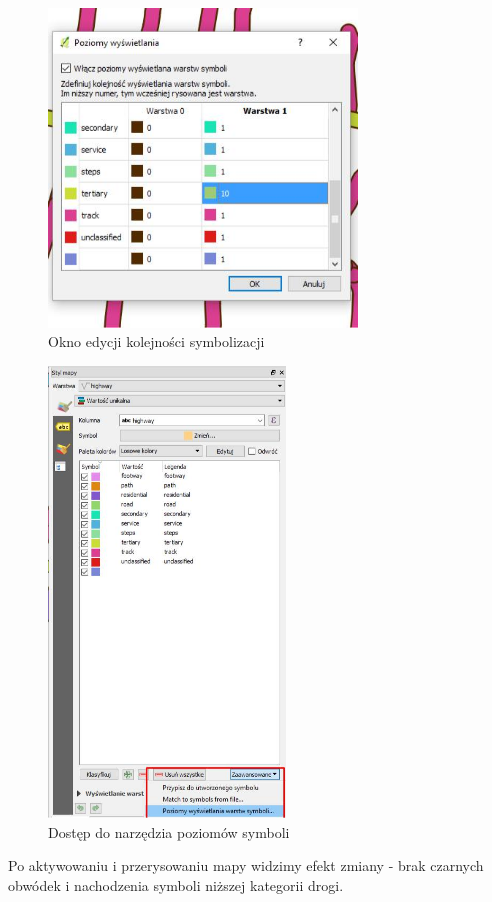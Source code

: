 \documentclass[12pt,a4paper]{book}
\begin{document}
\begin{figure}[!ht]
	\centering
\includegraphics[width=8.202cm,height=8.456cm]{007-warstwy-symbolu.jpg}
\caption{Okno edycji kolejności symbolizacji}
\end{figure}
\begin{figure}[!ht]
	\centering
	\includegraphics[width=6.301cm,height=11.966cm]{007-warstwy-miejsce.jpg}
	\caption{Dostęp do narzędzia poziomów symboli}
\end{figure}

Po aktywowaniu i przerysowaniu mapy widzimy efekt zmiany - brak czarnych obwódek i nachodzenia symboli niższej kategorii drogi.
\end{document}
